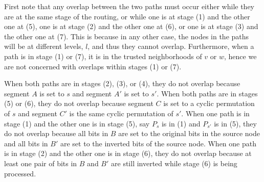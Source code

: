 \documentclass[prodmode,permissions]{acmsmall-ec16}
\begin{document}
First note that any overlap between the two paths must occur either while they
are at the same stage of the routing, or while one is at stage (1) and the other one at (5), one is at stage (2) and the other one at (6), or one is at stage (3) and the other one at (7).
This is because in any other case,
the nodes in the paths will be at different levels, $l$,
and thus they cannot overlap.
Furthermore, when a path is in stage (1) or (7),
it is in the trusted neighborhoods of $v$ or $w$,
hence we are not concerned with overlaps within stages (1) or (7). 

When both paths are in stages (2), (3), or (4), they do not overlap because
segment $A$ is set to $s$ and segment $A'$ is set to $s'$.
When both paths are in stages (5) or (6),
they do not overlap because segment $C$ is set to a cyclic permutation of $s$
and segment $C'$ is the same cyclic permutation of $s'$.
When one path is in stage (1) and the other one is in stage (5),
say $P_s$ is in (1) and $P_{s'}$ is in (5),
they do not overlap because all bits in $B$ are set to the original bits in the
source node and all bits in $B'$ are set to the inverted bits of the source node.
When one path is in stage (2) and the other one is in stage (6), they do not
overlap because at least one pair of bits in $B$ and $B'$ are still inverted
while stage (6) is being processed. 
\end{document}
